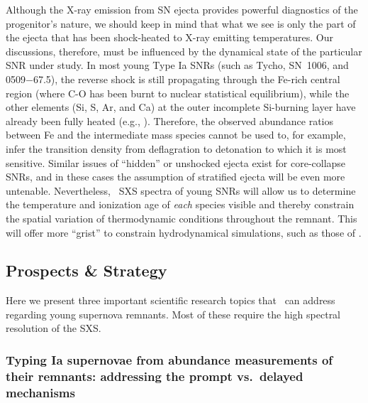 \documentclass[11pt,a4paper]{article}
\begin{document}
Although the X-ray emission from SN ejecta provides powerful
diagnostics of the progenitor's nature, we should keep in mind that
what we see is only the part of the ejecta that has been shock-heated
to X-ray emitting temperatures. Our discussions, therefore, must be
influenced by the dynamical state of the particular SNR under
study. In most young Type Ia SNRs (such as Tycho, SN~1006, and
0509$-$67.5), the reverse shock is still propagating through the
Fe-rich central region (where C-O has been burnt to nuclear
statistical equilibrium), while the other elements (Si, S, Ar, and Ca)
at the outer incomplete Si-burning layer have already been fully
heated (e.g., \citealt{hwang97, warrenhughes04}).  Therefore, the
observed abundance ratios between Fe and the intermediate mass species
cannot be used to, for example, infer the transition density from
deflagration to detonation to which it is most sensitive. Similar
issues of ``hidden'' or unshocked ejecta exist for core-collapse SNRs, and in
these cases the assumption of stratified ejecta will be even more
untenable. Nevertheless, \ah\ SXS spectra of young SNRs will allow
us to determine the temperature and ionization age of \textit{each}
species visible and thereby constrain the spatial variation of
thermodynamic conditions throughout the remnant. This will offer more
``grist'' to constrain hydrodynamical simulations, such as those of
\citet{badenes03, badenes06}.

\subsection{Prospects \& Strategy}

Here we present three important scientific research topics that
\ah\ can address regarding young supernova remnants. Most of these
require the high spectral resolution of the SXS.

\subsubsection{Typing Ia supernovae from abundance measurements of their 
remnants: addressing the prompt vs.\ delayed mechanisms}
\end{document}
